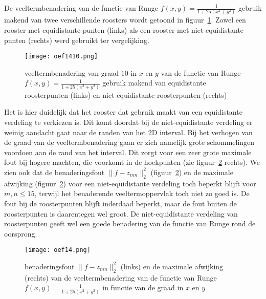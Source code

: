 De veeltermbenadering van de functie van Runge $f(x,y)=\frac{1}{1+25(x^2+y^2)}$ gebruik makend van twee verschillende roosters wordt getoond in figuur~\ref{fig:oef14resultaat}.
Zowel een rooster met equidistante punten (links) als een rooster met niet-equidistante punten (rechts) werd gebruikt ter vergelijking.

\begin{figure}[H]
    \centering
    \texttt{[image: oef1410.png]}
    \caption{veeltermbenadering van graad $10$ in $x$ en $y$ van de functie van Runge $f(x,y)=\frac{1}{1+25(x^2+y^2)}$ gebruik makend van equidistante roosterpunten (links) en niet-equidistante roosterpunten (rechts)}
    \label{fig:oef14resultaat}
\end{figure}

Het is hier duidelijk dat het rooster dat gebruik maakt van een equidistante verdeling te verkiezen is. Dit komt doordat bij de niet-equidistante verdeling er weinig aandacht gaat naar de randen van het 2D interval. Bij het verhogen van de graad van de veeltermbenadering gaan er zich namelijk grote schommelingen voordoen aan de rand van het interval. Dit zorgt voor een zeer grote maximale fout bij hogere machten, die voorkomt in de hoekpunten (zie figuur~\ref{fig:oef14} rechts). We zien ook dat de benaderingsfout $\lVert f-z_{mn} \rVert_2^2$ (figuur~\ref{fig:oef14}) en de maximale afwijking (figuur~\ref{fig:oef14}) voor een niet-equidistante verdeling toch beperkt blijft voor $m,n \leq 15$, terwijl het benaderende veeltermoppervlak toch niet zo goed is. De fout bij de roosterpunten blijft inderdaad beperkt, maar de fout buiten de roosterpunten is daarentegen wel groot. De niet-equidistante verdeling van roosterpunten geeft wel een goede benadering van de functie van Runge rond de oorsprong.

\begin{figure}[H]
    \centering
    \texttt{[image: oef14.png]}
    \caption{benaderingsfout $\lVert f-z_{mn} \rVert_2^2$ (links) en de maximale afwijking (rechts) van de veeltermbenadering van de functie van Runge $f(x,y)=\frac{1}{1+25(x^2+y^2)}$ in functie van de graad in $x$ en $y$}
    \label{fig:oef14}
\end{figure}

